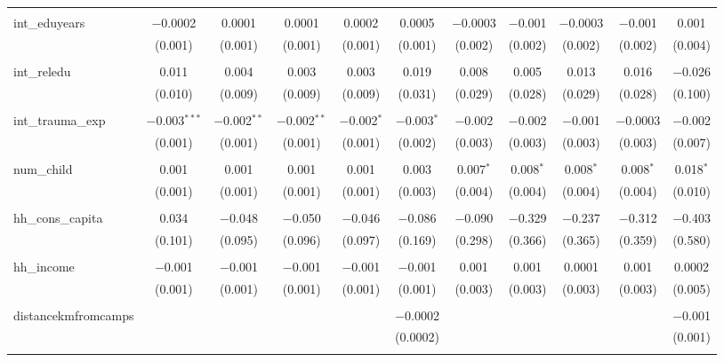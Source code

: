\begin{table}[H]
\begin{tabular}{@{\extracolsep{4pt}}lcccccccccc}
  & & & & & & & & & & \\ 
 int\_eduyears & $-$0.0002 & 0.0001 & 0.0001 & 0.0002 & 0.0005 & $-$0.0003 & $-$0.001 & $-$0.0003 & $-$0.001 & 0.001 \\ 
  & (0.001) & (0.001) & (0.001) & (0.001) & (0.001) & (0.002) & (0.002) & (0.002) & (0.002) & (0.004) \\ 
  & & & & & & & & & & \\ 
 int\_reledu & 0.011 & 0.004 & 0.003 & 0.003 & 0.019 & 0.008 & 0.005 & 0.013 & 0.016 & $-$0.026 \\ 
  & (0.010) & (0.009) & (0.009) & (0.009) & (0.031) & (0.029) & (0.028) & (0.029) & (0.028) & (0.100) \\ 
  & & & & & & & & & & \\ 
 int\_trauma\_exp & $-$0.003$^{***}$ & $-$0.002$^{**}$ & $-$0.002$^{**}$ & $-$0.002$^{*}$ & $-$0.003$^{*}$ & $-$0.002 & $-$0.002 & $-$0.001 & $-$0.0003 & $-$0.002 \\ 
  & (0.001) & (0.001) & (0.001) & (0.001) & (0.002) & (0.003) & (0.003) & (0.003) & (0.003) & (0.007) \\ 
  & & & & & & & & & & \\ 
 num\_child & 0.001 & 0.001 & 0.001 & 0.001 & 0.003 & 0.007$^{*}$ & 0.008$^{*}$ & 0.008$^{*}$ & 0.008$^{*}$ & 0.018$^{*}$ \\ 
  & (0.001) & (0.001) & (0.001) & (0.001) & (0.003) & (0.004) & (0.004) & (0.004) & (0.004) & (0.010) \\ 
  & & & & & & & & & & \\ 
 hh\_cons\_capita & 0.034 & $-$0.048 & $-$0.050 & $-$0.046 & $-$0.086 & $-$0.090 & $-$0.329 & $-$0.237 & $-$0.312 & $-$0.403 \\ 
  & (0.101) & (0.095) & (0.096) & (0.097) & (0.169) & (0.298) & (0.366) & (0.365) & (0.359) & (0.580) \\ 
  & & & & & & & & & & \\ 
 hh\_income & $-$0.001 & $-$0.001 & $-$0.001 & $-$0.001 & $-$0.001 & 0.001 & 0.001 & 0.0001 & 0.001 & 0.0002 \\ 
  & (0.001) & (0.001) & (0.001) & (0.001) & (0.001) & (0.003) & (0.003) & (0.003) & (0.003) & (0.005) \\ 
  & & & & & & & & & & \\ 
 distancekmfromcamps &  &  &  &  & $-$0.0002 &  &  &  &  & $-$0.001 \\ 
  &  &  &  &  & (0.0002) &  &  &  &  & (0.001) \\ 
  & & & & & & & & & & \\ 

\end{tabular}
\end{table}
